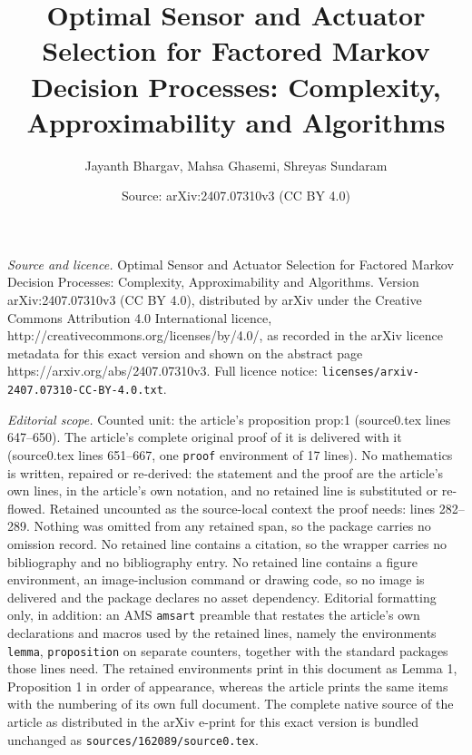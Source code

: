 \documentclass[10pt,a4paper]{amsart}
\title{Optimal Sensor and Actuator Selection for Factored Markov Decision Processes: Complexity, Approximability and Algorithms}
\author{Jayanth Bhargav, Mahsa Ghasemi, Shreyas Sundaram}
\date{Source: arXiv:2407.07310v3 (CC BY 4.0)}
\begin{document}
\maketitle

\noindent\emph{Source and licence.} Optimal Sensor and Actuator Selection for Factored Markov Decision Processes: Complexity, Approximability and Algorithms. Version arXiv:2407.07310v3 (CC BY 4.0), distributed by arXiv under the Creative Commons Attribution 4.0 International licence, http://creativecommons.org/licenses/by/4.0/, as recorded in the arXiv licence metadata for this exact version and shown on the abstract page https://arxiv.org/abs/2407.07310v3. Full licence notice: \texttt{licenses/arxiv-2407.07310-CC-BY-4.0.txt}.\par\smallskip

\noindent\textit{Editorial scope.} Counted unit: the article's proposition prop:1 (source0.tex lines 647--650). The article's complete original proof of it is delivered with it (source0.tex lines 651--667, one \texttt{proof} environment of 17 lines). No mathematics is written, repaired or re-derived: the statement and the proof are the article's own lines, in the article's own notation, and no retained line is substituted or re-flowed.  Retained uncounted as the source-local context the proof needs: lines 282--289.  Nothing was omitted from any retained span, so the package carries no omission record.  No retained line contains a citation, so the wrapper carries no bibliography and no bibliography entry.  No retained line contains a figure environment, an image-inclusion command or drawing code, so no image is delivered and the package declares no asset dependency.  Editorial formatting only, in addition: an AMS \texttt{amsart} preamble that restates the article's own declarations and macros used by the retained lines, namely the environments \texttt{lemma}, \texttt{proposition} on separate counters, together with the standard packages those lines need.  The retained environments print in this document as Lemma 1, Proposition 1 in order of appearance, whereas the article prints the same items with the numbering of its own full document.  The complete native source of the article as distributed in the arXiv e-print for this exact version is bundled unchanged as \texttt{sources/162089/source0.tex}.
\end{document}
